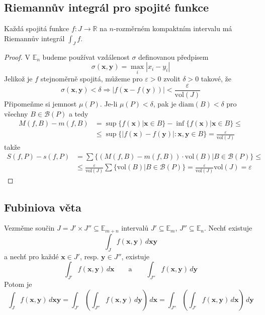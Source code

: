 \documentclass[../main.tex]{subfiles}
\begin{document}
\subsection{Riemannův integrál pro spojité funkce}
\begin{theorem}
	Každá spojitá funkce $f: J \to \mathbb{R}$ na $n$-rozměrném kompaktním intervalu má Riemannův integrál
	$\int_{J}f$.
\end{theorem}

\begin{proof}
	V $\mathbb{E}_n$ budeme používat vzdálenost $\sigma$ definovanou předpisem
	\[ \sigma (\mathbf{x}, \mathbf{y}) = \max_{i} |x_i - y_i| \]
	Jelikož je $f$ stejnoměrně spojitá, můžeme pro $\varepsilon > 0$ zvolit $\delta > 0$ takové, že
	\[ \sigma (\mathbf{x}, \mathbf{y}) < \delta \Rightarrow
	|f(\mathbf{x} - f(\mathbf{y}))| < \frac{\varepsilon}{\textrm{vol}(J)} \]
	Připomeňme si jemnost $\mu (P)$. Je-li $\mu (P) < \delta$, pak je $\textrm{diam}(B) < \delta$ pro všechny
	$ B \in \mathcal{B}(P) $ a tedy
	\begin{align*}
			M(f, B) - m(f, B) &= \sup\{ f(\mathbf{x})|\mathbf{x} \in B \} -
			\inf\{ f(\mathbf{x})|\mathbf{x} \in B\}\leq\\
			&\leq \sup\{ |f(\mathbf{x}) - f(\mathbf{y})|: \mathbf{x}, \mathbf{y} \in B \}
			= \frac{\varepsilon}{\textrm{vol}(J)}
	\end{align*}
	takže
	\begin{align*}
			S(f,P) - s(f,P) &= \sum \{ (M(f,B) - m(f,B))\cdot \textrm{vol}(B)|B\in \mathcal{B}(P) \}\leq\\
			&\leq \frac{\varepsilon}{\textrm{vol}(J)}\sum \{ \textrm{vol}(B)| B\in \mathcal{B}(P) \}
			= \frac{\varepsilon}{\textrm{vol}(J)}\textrm{vol}(J) = \varepsilon
	\end{align*}
\end{proof}

\subsection{Fubiniova věta}
\begin{theorem}
	Vezměme součin $J = J' \times J'' \subseteq \mathbb{E}_{m+n}$ intervalů $J' \subseteq \mathbb{E}_m$,
	$J'' \subseteq \mathbb{E}_n$. Nechť existuje
	\[ \int_{J} f(\mathbf{x}, \mathbf{y}) \,d\mathbf{xy} \]
	a nechť pro každé $\mathbf{x} \in J'$, resp. $\mathbf{y} \in J''$, existuje
	\[ \int_{J'} f(\mathbf{x}, \mathbf{y}) \,d\mathbf{x} \qquad \text{a} \qquad \int_{J''} f(\mathbf{x}, \mathbf{y}) \,d\mathbf{y} \]
	Potom je
	\[ \int_J f(\mathbf{x}, \mathbf{y}) \,d\mathbf{xy} =
	\int_{J'} \left( \int_{J''} f(\mathbf{x}, \mathbf{y}) \,d\mathbf{y} \right) \,d\mathbf{x} = 
	\int_{J''} \left( \int_{J'} f(\mathbf{x}, \mathbf{y}) \,d\mathbf{x} \right) \,d\mathbf{y}\]
\end{theorem}
\end{document}

